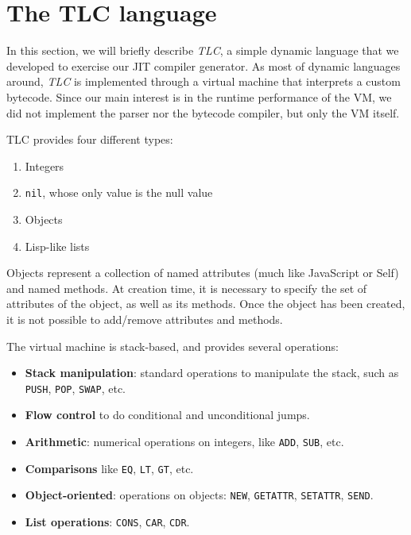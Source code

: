 \section{The TLC language}

In this section, we will briefly describe \emph{TLC}, a simple dynamic
language that we developed to exercise our JIT compiler generator.  As most of
dynamic languages around, \emph{TLC} is implemented through a virtual machine
that interprets a custom bytecode. Since our main interest is in the runtime
performance of the VM, we did not implement the parser nor the bytecode
compiler, but only the VM itself.

TLC provides four different types:
\begin{enumerate}
\item Integers
\item \lstinline{nil}, whose only value is the null value
\item Objects
\item Lisp-like lists
\end{enumerate}

Objects represent a collection of named attributes (much like JavaScript or
Self) and named methods.  At creation time, it is necessary to specify the set
of attributes of the object, as well as its methods.  Once the object has been
created, it is not possible to add/remove attributes and methods.

The virtual machine is stack-based, and provides several operations:

\begin{itemize}
\item \textbf{Stack manipulation}: standard operations to manipulate the
  stack, such as \lstinline{PUSH}, \lstinline{POP}, \lstinline{SWAP}, etc.
\item \textbf{Flow control} to do conditional and unconditional jumps.
\item \textbf{Arithmetic}: numerical operations on integers, like
  \lstinline{ADD}, \lstinline{SUB}, etc.
\item \textbf{Comparisons} like \lstinline{EQ}, \lstinline{LT},
  \lstinline{GT}, etc.
\item \textbf{Object-oriented}: operations on objects: \lstinline{NEW},
  \lstinline{GETATTR}, \lstinline{SETATTR}, \lstinline{SEND}.
\item \textbf{List operations}: \lstinline{CONS}, \lstinline{CAR},
  \lstinline{CDR}.
\end{itemize}

